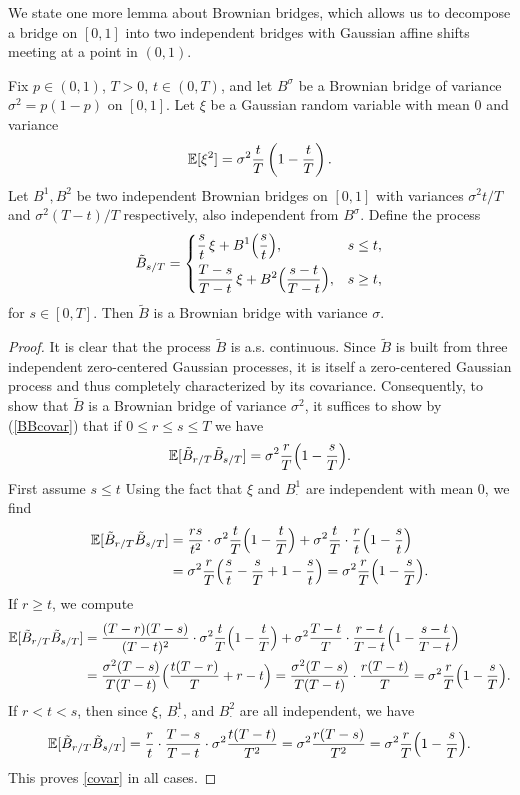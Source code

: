 We state one more lemma about Brownian bridges, which allows us to decompose a bridge on $[0,1]$ into two independent bridges with Gaussian affine shifts meeting at a point in $(0,1)$.

\begin{lemma}\label{2bridges}
	Fix $p\in (0,1)$, $T>0$, $t\in(0,T)$, and let $B^\sigma$ be a Brownian bridge of variance $\sigma^2 = p(1-p)$ on $[0,1]$. Let $\xi$ be a Gaussian random variable with mean 0 and variance
	\[
	\mathbb{E}[\xi^2] = \sigma^2\frac{t}{T}\left(1-\frac{t}{T}\right).
	\]
	Let $B^1,B^2$ be two independent Brownian bridges on $[0,1]$ with variances $\sigma^2 t/T$ and $\sigma^2(T-t)/T$ respectively, also independent from $B^\sigma$. Define the process
	\[
	\tilde{B}_{s/T} = \begin{dcases}
	\frac{s}{t}\,\xi + B^1\Big(\frac{s}{t}\Big), & s\leq t,\\
	\frac{T-s}{T-t}\,\xi + B^2\Big(\frac{s-t}{T-t}\Big), & s\geq t,
	\end{dcases}
	\]
	for $s\in [0,T]$. Then $\tilde{B}$ is a Brownian bridge with variance $\sigma$.
\end{lemma}

\begin{proof}
	It is clear that the process $\tilde{B}$ is a.s. continuous. Since $\tilde{B}$ is built from three independent zero-centered Gaussian processes, it is itself a zero-centered Gaussian process and thus completely characterized by its covariance. Consequently, to show that $\tilde{B}$ is a Brownian bridge of variance $\sigma^2$, it suffices to show by (\ref{BBcovar}) that if $0\leq r\leq s\leq T$ we have
	\begin{equation}\label{covar}
	\mathbb{E}[\tilde{B}_{r/T}\tilde{B}_{s/T}] = \sigma^2 \frac{r}{T}\Big(1-\frac{s}{T}\Big).
	\end{equation}
	First assume $s\leq t$ Using the fact that $\xi$ and $B^1_\cdot$ are independent with mean 0, we find
	\begin{align*}
	\mathbb{E}[\tilde{B}_{r/T}\tilde{B}_{s/T}] &= \frac{rs}{t^2}\cdot\sigma^2\frac{t}{T}\Big(1-\frac{t}{T}\Big) + \sigma^2\frac{t}{T}\cdot\frac{r}{t}\Big(1-\frac{s}{t}\Big)\\
	&= \sigma^2\frac{r}{T}\Big(\frac{s}{t} - \frac{s}{T} + 1 - \frac{s}{t}\Big) = \sigma^2\frac{r}{T}\Big(1-\frac{s}{T}\Big).
	\end{align*}
	If $r\geq t$, we compute
	\begin{align*}
	\mathbb{E}[\tilde{B}_{r/T}\tilde{B}_{s/T}] &= \frac{(T-r)(T-s)}{(T-t)^2}\cdot\sigma^2\frac{t}{T}\Big( 1 - \frac{t}{T}\Big) + \sigma^2\frac{T-t}{T}\cdot\frac{r-t}{T-t}\Big( 1 - \frac{s-t}{T-t}\Big)\\
	&= \frac{\sigma^2(T-s)}{T(T-t)}\Big(\frac{t(T-r)}{T} + r-t\Big) = \frac{\sigma^2(T-s)}{T(T-t)}\cdot\frac{r(T-t)}{T} = \sigma^2\frac{r}{T}\Big(1-\frac{s}{T}\Big).
	\end{align*}
	If $r < t < s$, then since $\xi$, $B^1_\cdot$, and $B^2_\cdot$ are all independent, we have
	\[
	\mathbb{E}[\tilde{B}_{r/T}\tilde{B}_{s/T}] = \frac{r}{t}\cdot\frac{T-s}{T-t}\cdot\sigma^2\frac{t(T-t)}{T^2} = \sigma^2\frac{r(T-s)}{T^2} = \sigma^2\frac{r}{T}\Big(1-\frac{s}{T}\Big).
	\]
	This proves \eqref{covar} in all cases.
\end{proof}

